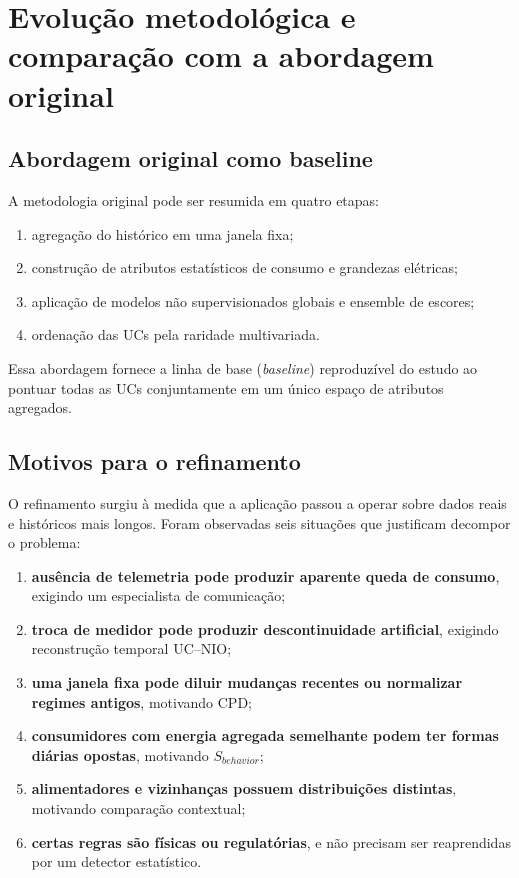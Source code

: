 \chapter{Evolução metodológica e comparação com a abordagem original}\label{evoluuxe7uxe3o-metodoluxf3gica-e-comparauxe7uxe3o-com-a-abordagem-original}

\section{Abordagem original como baseline}\label{abordagem-original-como-baseline}

A metodologia original pode ser resumida em quatro etapas:

\begin{enumerate}
\def\labelenumi{\arabic{enumi}.}
\item
  agregação do histórico em uma janela fixa;
\item
  construção de atributos estatísticos de consumo e grandezas elétricas;
\item
  aplicação de modelos não supervisionados globais e ensemble de escores;
\item
  ordenação das UCs pela raridade multivariada.
\end{enumerate}

Essa abordagem fornece a linha de base (\emph{baseline}) reproduzível do estudo ao pontuar todas as UCs conjuntamente em um único espaço de atributos agregados.

\section{Motivos para o refinamento}\label{motivos-para-o-refinamento}

O refinamento surgiu à medida que a aplicação passou a operar sobre dados reais e históricos mais longos. Foram observadas seis situações que justificam decompor o problema:

\begin{enumerate}
\def\labelenumi{\arabic{enumi}.}
\item
  \textbf{ausência de telemetria pode produzir aparente queda de consumo}, exigindo um especialista de comunicação;
\item
  \textbf{troca de medidor pode produzir descontinuidade artificial}, exigindo reconstrução temporal UC--NIO;
\item
  \textbf{uma janela fixa pode diluir mudanças recentes ou normalizar regimes antigos}, motivando CPD;
\item
  \textbf{consumidores com energia agregada semelhante podem ter formas diárias opostas}, motivando \(S_{behavior}\);
\item
  \textbf{alimentadores e vizinhanças possuem distribuições distintas}, motivando comparação contextual;
\item
  \textbf{certas regras são físicas ou regulatórias}, e não precisam ser reaprendidas por um detector estatístico.
\end{enumerate}

